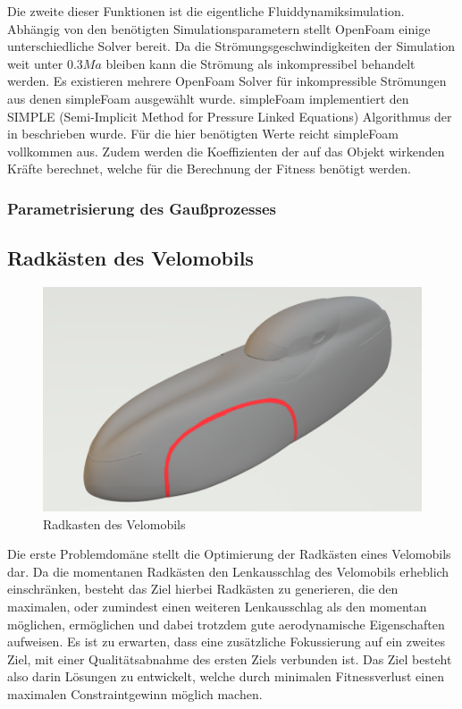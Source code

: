 Die zweite dieser Funktionen ist die eigentliche Fluiddynamiksimulation.
Abhängig von den benötigten Simulationsparametern stellt OpenFoam einige unterschiedliche Solver bereit.
Da die Strömungsgeschwindigkeiten der Simulation weit unter $0.3Ma$ bleiben kann die Strömung als inkompressibel behandelt werden.
Es existieren mehrere OpenFoam Solver für inkompressible Strömungen aus denen simpleFoam ausgewählt wurde.
simpleFoam implementiert den SIMPLE (Semi-Implicit Method for Pressure Linked Equations) Algorithmus der in \cite{Caretto.1973} beschrieben wurde.
Für die hier benötigten Werte reicht simpleFoam vollkommen aus.
Zudem werden die Koeffizienten der auf das Objekt wirkenden Kräfte berechnet, welche für die Berechnung der Fitness benötigt werden. 

\subsubsection{Parametrisierung des Gaußprozesses}



\subsection{Radkästen des Velomobils}
\label{sub:method_wheelcase}
\begin{figure}[h]
	\centering
	\includegraphics[width=.8\linewidth]{bilder/velo_wheelcase}
	\caption{Radkasten des Velomobils}
	\label{fig:wheelcase}
\end{figure}

Die erste Problemdomäne stellt die Optimierung der Radkästen eines Velomobils dar.
Da die momentanen Radkästen den Lenkausschlag des Velomobils erheblich einschränken, besteht das Ziel hierbei Radkästen zu generieren, die den maximalen, oder zumindest einen weiteren Lenkausschlag als den momentan möglichen, ermöglichen und dabei trotzdem gute aerodynamische Eigenschaften aufweisen.
Es ist zu erwarten, dass eine zusätzliche Fokussierung auf ein zweites Ziel, mit einer Qualitätsabnahme des ersten Ziels verbunden ist.
Das Ziel besteht also darin Lösungen zu entwickelt, welche durch minimalen Fitnessverlust einen maximalen Constraintgewinn möglich machen.

